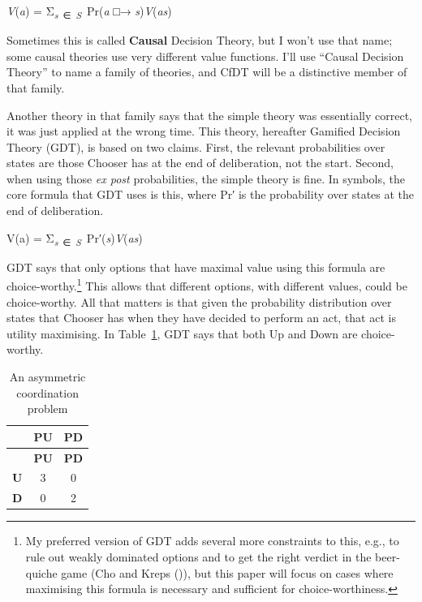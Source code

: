 \documentclass[
  10pt,
  letterpaper,
  DIV=11,
  numbers=noendperiod,
  twoside]{scrartcl}
\providecommand{\tightlist}{%
  \setlength{\itemsep}{0pt}\setlength{\parskip}{0pt}}\usepackage{longtable,booktabs,array}
\begin{document}
\begin{description}
\tightlist
\item[CfDT]
\emph{V}(\emph{a}) = Σ\textsubscript{\emph{s}~∈~\emph{S}}~Pr(\emph{a} □→
\emph{s})\emph{V}(\emph{as})
\end{description}

Sometimes this is called \textbf{Causal} Decision Theory, but I won't
use that name; some causal theories use very different value functions.
I'll use ``Causal Decision Theory'' to name a family of theories, and
CfDT will be a distinctive member of that family.

Another theory in that family says that the simple theory was
essentially correct, it was just applied at the wrong time. This theory,
hereafter Gamified Decision Theory (GDT), is based on two claims. First,
the relevant probabilities over states are those Chooser has at the end
of deliberation, not the start. Second, when using those \emph{ex post}
probabilities, the simple theory is fine. In symbols, the core formula
that GDT uses is this, where Pr′ is the probability over states at the
end of deliberation.

\begin{description}
\tightlist
\item[GDT]
V(a) =
Σ\textsubscript{\emph{s}~∈~\emph{S}}~Pr′(\emph{s})\emph{V}(\emph{as})
\end{description}

GDT says that only options that have maximal value using this formula
are choice-worthy.\footnote{My preferred version of GDT adds several
  more constraints to this, e.g., to rule out weakly dominated options
  and to get the right verdict in the beer-quiche game (Cho and Kreps
  ()), but this paper will focus on
  cases where maximising this formula is necessary and sufficient for
  choice-worthiness.} This allows that different options, with different
values, could be choice-worthy. All that matters is that given the
probability distribution over states that Chooser has when they have
decided to perform an act, that act is utility maximising. In
Table~\ref{tbl-first-coord}, GDT says that both Up and Down are
choice-worthy.

\begin{longtable}[]{@{}ccc@{}}
\caption{An asymmetric coordination
problem}\label{tbl-first-coord}\tabularnewline
\toprule\noalign{}
& \textbf{PU} & \textbf{PD} \\
\midrule\noalign{}
\endfirsthead
\toprule\noalign{}
& \textbf{PU} & \textbf{PD} \\
\midrule\noalign{}
\endhead
\bottomrule\noalign{}
\endlastfoot
\textbf{U} & 3 & 0 \\
\textbf{D} & 0 & 2 \\
\end{longtable}
\end{document}
